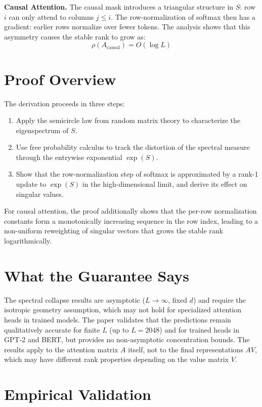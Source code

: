 \documentclass[10pt,twocolumn]{article}
\begin{document}
\textbf{Causal Attention.} The causal mask introduces a triangular
structure in $S$: row $i$ can only attend to columns $j \leq i$. The
row-normalization of softmax then has a gradient: earlier rows normalize
over fewer tokens. The analysis shows that this asymmetry causes the
stable rank to grow as:
\[
  \rho(A_{\text{causal}}) = O(\log L)
\]

\section{Proof Overview}

The derivation proceeds in three steps:
\begin{enumerate}[itemsep=2pt,parsep=0pt]
  \item Apply the semicircle law from random matrix theory to
    characterize the eigenspectrum of $S$.
  \item Use free probability calculus to track the distortion of the
    spectral measure through the entrywise exponential
    $\exp(S)$.
  \item Show that the row-normalization step of softmax is approximated
    by a rank-1 update to $\exp(S)$ in the high-dimensional limit, and
    derive its effect on singular values.
\end{enumerate}

For causal attention, the proof additionally shows that the
per-row normalization constants form a monotonically increasing sequence
in the row index, leading to a non-uniform reweighting of singular
vectors that grows the stable rank logarithmically.

\section{What the Guarantee Says}

The spectral collapse results are asymptotic ($L \to \infty$, fixed $d$)
and require the isotropic geometry assumption, which may not hold for
specialized attention heads in trained models. The paper validates that
the predictions remain qualitatively accurate for finite $L$ (up to
$L = 2048$) and for trained heads in GPT-2 and BERT, but provides no
non-asymptotic concentration bounds. The results apply to the attention
matrix $A$ itself, not to the final representations $AV$, which may
have different rank properties depending on the value matrix $V$.

\section{Empirical Validation}
\end{document}
